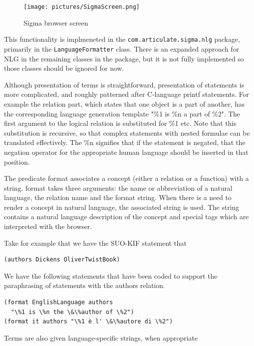 \documentclass{book}
\begin{document}
\begin{figure}
  \centering
  \texttt{[image: pictures/SigmaScreen.png]}
  \caption{Sigma browser screen}
  \label{fig:SigmaScreen}
\end{figure}

This functionality is implmeneted in the \texttt{com.articulate.sigma.nlg}
package, primarily in the \texttt{LanguageFormatter} class.  There is an
expanded approach for NLG in the remaining classes in the package, but it is
not fully implemented so those classes should be ignored for now.

Although presentation of terms is straightforward, presentation of statements is
more complicated, and roughly patterned after C-language printf
statements. For example the relation part, which states that one object is a
part of another, has the corresponding language generation template "\%1 is \%n
a part of \%2". The first argument to the logical relation is substituted for
\%1 etc. Note that this substitution is recursive, so that complex statements
with nested formulae can be translated effectively. The \%n signifies that if
the statement is negated, that the negation operator for the appropriate human
language should be inserted in that position.

The predicate format associates a concept (either a relation or a function) with
a string.  format takes three arguments: the name or abbreviation of a natural
language, the relation name and the format string.  When there is a need to
render a concept in natural language, the associated string is used.  The string
contains a natural language description of the concept and special tags which
are interpreted with the browser.

Take for example that we have the SUO-KIF statement that

\begin{verbatim}
(authors Dickens OliverTwistBook)
\end{verbatim}

We have the following statements that have been coded to support the
paraphrasing of statements with the authors relation.

\begin{verbatim}
(format EnglishLanguage authors
  "\%1 is \%n the \&\%author of \%2")
(format it authors "\%1 è l' \&\%autore di \%2")
\end{verbatim}

Terms are also given language-specific strings, when appropriate
\end{document}
